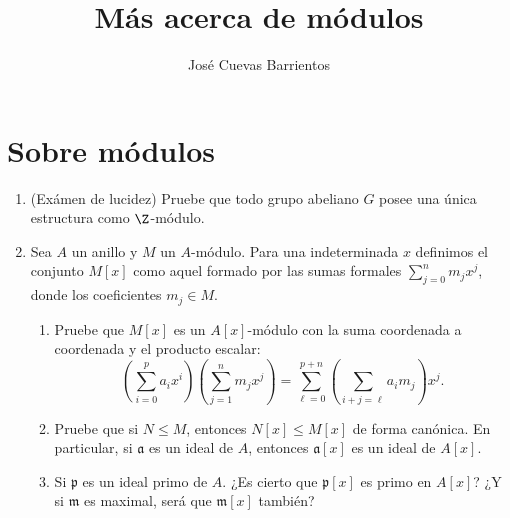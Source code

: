 \documentclass[11pt, reqno]{amsart}
\title{Más acerca de módulos}
\date{\DTMdate{2025-05-22}}
\author{José Cuevas Barrientos}
\begin{document}
\maketitle

\nocite{atiyah:commutative}

\section{Sobre módulos}
\begin{enumerate}
	\item\lookright
		(Exámen de lucidez)
		Pruebe que todo grupo abeliano $G$ posee una única estructura como $\Z$-módulo.
	\item Sea $A$ un anillo y $M$ un $A$-módulo.
		Para una indeterminada $x$ definimos el conjunto $M[x]$ como aquel formado por las sumas formales
		$\sum_{j=0}^{n} m_jx^j$, donde los coeficientes $m_j \in M$.
		\begin{enumerate}
			\item Pruebe que $M[x]$ es un $A[x]$-módulo con la suma coordenada a coordenada y el producto
				escalar:
				\[
					\left( \sum_{i=0}^{p} a_ix^i \right)\left( \sum_{j=1}^{n} m_jx^j \right) =
					\sum_{\ell=0}^{p+n} \left( \sum_{i+j=\ell} a_im_j \right) x^j.
				\]
			\item Pruebe que si $N \le M$, entonces $N[x] \le M[x]$ de forma canónica.
				En particular, si $\mathfrak{a}$ es un ideal de $A$, entonces $\mathfrak{a}[x]$ es un
				ideal de $A[x]$.
			\item\lookright
				Si $\mathfrak{p}$ es un ideal primo de $A$.
				¿Es cierto que $\mathfrak{p}[x]$ es primo en $A[x]$?
				¿Y si $\mathfrak{m}$ es maximal, será que $\mathfrak{m}[x]$ también?
		\end{enumerate}


\end{enumerate}
\end{document}

